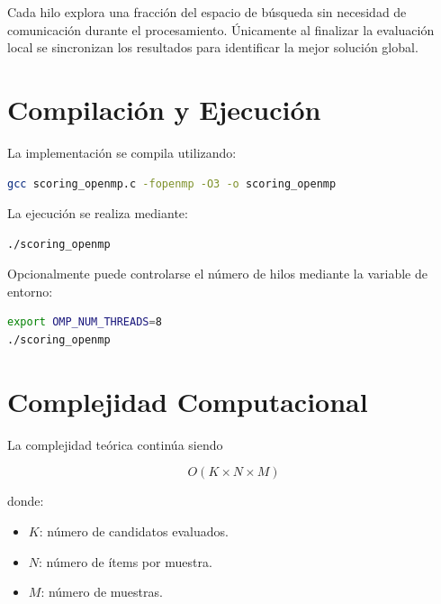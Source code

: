Cada hilo explora una fracción del espacio de búsqueda sin necesidad de comunicación durante el procesamiento. Únicamente al finalizar la evaluación local se sincronizan los resultados para identificar la mejor solución global.


\section{Compilación y Ejecución}

La implementación se compila utilizando:

\begin{lstlisting}[language=bash]
gcc scoring_openmp.c -fopenmp -O3 -o scoring_openmp
\end{lstlisting}

La ejecución se realiza mediante:

\begin{lstlisting}[language=bash]
./scoring_openmp
\end{lstlisting}

Opcionalmente puede controlarse el número de hilos mediante la variable de entorno:

\begin{lstlisting}[language=bash]
export OMP_NUM_THREADS=8
./scoring_openmp
\end{lstlisting}


\section{Complejidad Computacional}

La complejidad teórica continúa siendo

\[
O(K \times N \times M)
\]

donde:

\begin{itemize}

\item \(K\): número de candidatos evaluados.

\item \(N\): número de ítems por muestra.

\item \(M\): número de muestras.

\end{itemize}

